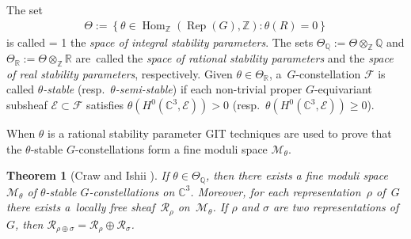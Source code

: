 \documentclass[10pt,a4paper]{amsart}
\numberwithin{equation}{section}
\newcommand{\sE}{\mathscr{E}}
\newcommand{\sF}{\mathscr{F}}
\newcommand{\sM}{\mathscr{M}}
\newcommand{\sR}{\mathscr{R}}
\newcommand{\Z}{{\mathbb Z}}
\newcommand{\Q}{{\mathbb Q}}
\newcommand{\R}{{\mathbb R}}
\newcommand{\C}{{\mathbb C}}
\newcommand{\Hom}{\operatorname{Hom}}
\newcommand{\Rep}{\operatorname{Rep}}
\newtheorem{Theorem}{Theorem}[section]
\begin{document}
\begin{Definition}\label{Def_Theta}
  The set
  \begin{gather*}
    \Theta := \left\{ \theta\in\Hom_\Z(\Rep(G),\Z)\colon
                      \theta(R)=0 \right\}
  \end{gather*}
  is called \looseness= 1 the \emph{space of integral stability parameters}.  The
  sets $\Theta_\Q := \Theta \otimes_\Z \Q$ and $\Theta_\R := \Theta
  \otimes_\Z \R$ are~cal\-led the \emph{space of rational stability
    parameters} and the \emph{space of real stability parameters},
  respectively.  Given $\theta \in \Theta_\R$, a~$G$-constellation
  $\sF$ is called \emph{$\theta$-stable}
  (resp.\ \emph{$\theta$-semi-stable}) if each non-tri\-vial proper
  $G$-equivariant subsheaf $\sE\subset\sF$ satisf\/ies
  $\theta(H^0(\C^3, \sE))>0$ (resp.\ $\theta(H^0(\C^3, \sE))\geq
  0$).
\end{Definition}


When $\theta$ is a rational stability parameter GIT techniques are
used to prove that the $\theta$-stable $G$-constellations form a f\/ine
moduli space $\sM_{\theta}$.

\begin{Theorem}[Craw and Ishii ]\label{thm:ci21}
  If $\theta\in\Theta_\Q$, then there exists a fine moduli
  spa\-ce~$\sM_\theta$ of $\theta$-stable $G$-constellations on
  $\C^3$.  Moreover, for each representation~$\rho$ of~$G$ there
  exists a~locally free sheaf~$\sR_\rho$ on~$\sM_\theta$. If $\rho$
  and $\sigma$ are two representations of~$G$, then
  $\sR_{\rho\oplus\sigma}=\sR_\rho\oplus\sR_\sigma$.
\end{Theorem}
\end{document}
